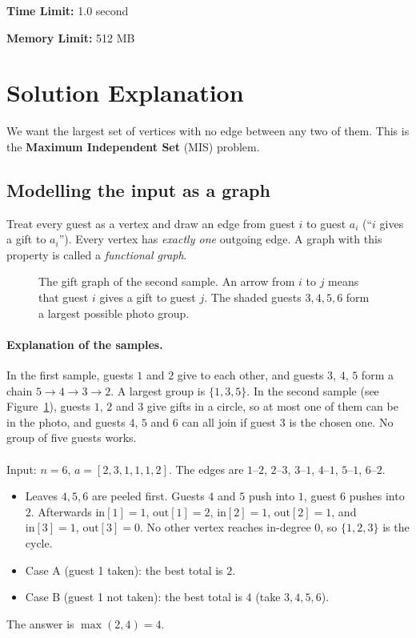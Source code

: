 \documentclass[11pt]{article}
\begin{document}
\noindent\textbf{Time Limit:} 1.0 second

\noindent\textbf{Memory Limit:} 512 MB


\newpage

\section*{Solution Explanation}

We want the largest set of vertices with no edge between any two of them. This is the \textbf{Maximum Independent Set} (MIS) problem.

\subsection*{Modelling the input as a graph}
Treat every guest as a vertex and draw an edge from guest $i$ to guest $a_i$ (``$i$ gives a gift to $a_i$''). Every vertex has \emph{exactly one} outgoing edge. A graph with this property is called a \emph{functional graph}.

\begin{figure}[h]
    \centering
    
    \caption{The gift graph of the second sample. An arrow from $i$ to $j$ means that guest $i$ gives a gift to guest $j$. The shaded
    guests $3, 4, 5, 6$ form a largest possible photo group.}
    \label{fig:sample2}
\end{figure}

\paragraph{Explanation of the samples.}
In the first sample, guests $1$ and $2$ give to each other, and guests $3$, $4$, $5$ form a chain $5 \to 4 \to 3 \to 2$. A largest group is $\{1, 3, 5\}$. In the second sample (see Figure~\ref{fig:sample2}), guests $1$, $2$ and $3$ give gifts in a circle, so at most one of them can be in the photo, and guests $4$, $5$ and $6$ can all join if guest $3$ is the chosen one. No group of five guests works.\\\\
Input: $n = 6$, $a = [2, 3, 1, 1, 1, 2]$. The edges are $1\text{--}2$, $2\text{--}3$, $3\text{--}1$, $4\text{--}1$, $5\text{--}1$, $6\text{--}2$.
\begin{itemize}
    \item Leaves $4, 5, 6$ are peeled first. Guests $4$ and $5$ push into $1$, guest $6$ pushes into $2$. Afterwards $\mathrm{in}[1] = 1$, $\mathrm{out}[1] = 2$, $\mathrm{in}[2] = 1$, $\mathrm{out}[2] = 1$, and $\mathrm{in}[3] = 1$, $\mathrm{out}[3] = 0$. No other vertex reaches in-degree $0$, so $\{1, 2, 3\}$ is the cycle.
    \item Case A (guest 1 taken): the best total is $2$.
    \item Case B (guest 1 not taken): the best total is $4$ (take $3, 4, 5, 6$).
\end{itemize}
The answer is $\max(2, 4) = 4$.
\end{document}
